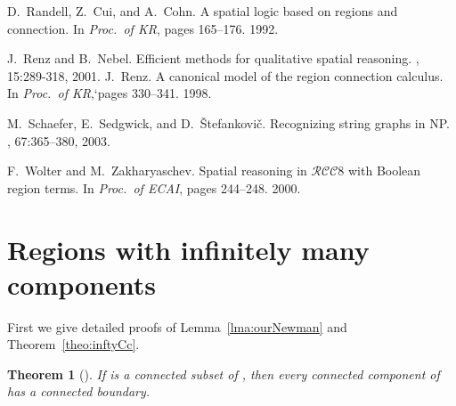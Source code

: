 \documentclass{article}
\newtheorem{theorem}{Theorem}
\newcommand{\RCCE}{\ensuremath{\mathcal{RCC}8}}\newcommand{\RCCF}{\ensuremath{\mathcal{RCC}5}}\newcommand{\BRCCE}{\ensuremath{\mathcal{BRCC}8}}\newcommand{\RCCEc}{\ensuremath{\RCCE{}c}}\newcommand{\RCCEci}{\ensuremath{\RCCE{}c^\circ}}\newcommand{\cBCc}{\ensuremath{\mathcal{C}c}}\newcommand{\cBCci}{\ensuremath{\mathcal{C}c^\circ}}
\begin{document}
\begin{thebibliography}{}
D.~Randell, Z.~Cui, and A.~Cohn.
\newblock A spatial logic based on regions and connection.
\newblock In {\em Proc.\ of
  KR}, pages 165--176. 1992.

J.~Renz and B.~Nebel.
\newblock Efficient methods for qualitative spatial reasoning.
, 15:289-318, 2001. 
J.~Renz.
\newblock A canonical model of the region connection calculus.
\newblock In {\em Proc.\ of
  KR},`pages 330--341. 1998.

M.~Schaefer, E.~Sedgwick, and D.~{\v{S}}tefankovi{\v{c}}.
\newblock Recognizing string graphs in {NP}.
, 67:365--380, 2003.

F.~Wolter and M.~Zakharyaschev.
\newblock Spatial reasoning in \RCCE{} with {B}oolean region terms.
\newblock In {\em Proc.\ of ECAI}, pages 244--248.  2000.

\end{thebibliography}

\cleardoublepage

\appendix

\section{Regions with infinitely many components}
\label{sec:sensitivityA}
First we give detailed proofs of Lemma~\ref{lma:ourNewman} and
Theorem~\ref{theo:inftyCc}.
\begin{theorem}[\cite{ijcai:Newman64}]\label{thm:NewmanBnd} 
If  is a connected subset of , then every connected component
of  has a connected boundary.
\end{theorem}
\end{document}
